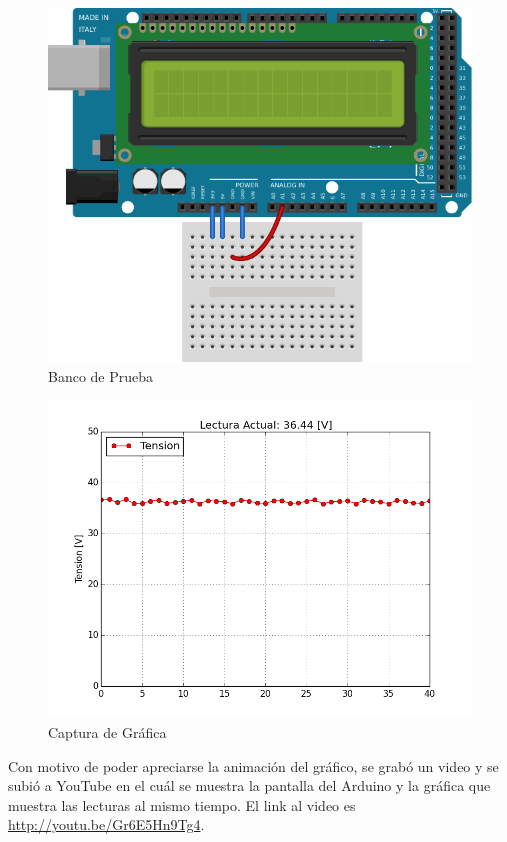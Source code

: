 \documentclass[12pt,a4paper]{article}
\begin{document}
				\begin{figure}[H]
					\centering
					\includegraphics[scale=1]{images/arduino8.pdf}\caption{Banco de Prueba}
					\end{figure}

				\begin{figure}[H]
					\centering
					\includegraphics[scale=0.75]{images/figure_1.png}\caption{Captura de Gráfica}
					\end{figure}

				Con motivo de poder apreciarse la animación del gráfico, se grabó un video y se subió a YouTube en el cuál se muestra la pantalla del Arduino y la gráfica que muestra las lecturas al mismo tiempo. El link al video es \url{http://youtu.be/Gr6E5Hn9Tg4}.
\end{document}
